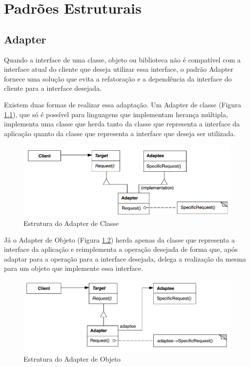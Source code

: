 \chapter{Padrões Estruturais}

\section{Adapter}

Quando a interface de uma classe, objeto ou biblioteca não 
é compatível com a interface atual do cliente que deseja 
utilizar essa interface, o padrão Adapter fornece uma 
solução que evita a refatoração e a dependência da interface 
do cliente para a interface desejada.

Existem duas formas de realizar essa adaptação. Um Adapter 
de classe (Figura \ref{adapter_struct}), que só é possível 
para linguagens que implementam herança múltipla, implementa 
uma classe que herda tanto da classe que representa a interface 
da aplicação quanto da classe que representa a interface que 
deseja ser utilizada. 

\begin{figure}[htb]
	\caption{\label{adapter_struct}Estrutura do Adapter de Classe}
	\begin{center}
	    \includegraphics[scale=0.5]{5_padroes-contexto-funcional/5.2_estruturais/5.2.1_adapter/diagram2.png}
	\end{center}
\end{figure}

Já o Adapter de Objeto (Figura \ref{adapter_alt_struct}) 
herda apenas da classe que representa 
a interface da aplicação e reimplementa a operação desejada 
de forma que, após adaptar para a operação para a interface 
desejada, delega a realização da mesma para um objeto que 
implemente essa interface.

\begin{figure}[htb]
	\caption{\label{adapter_alt_struct}Estrutura do Adapter de Objeto}
	\begin{center}
	    \includegraphics[scale=0.4]{5_padroes-contexto-funcional/5.2_estruturais/5.2.1_adapter/diagram.png}
	\end{center}
\end{figure}

